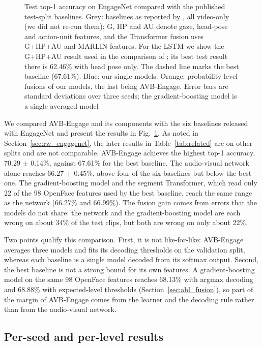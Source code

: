\documentclass[pdflatex,iicol,sn-basic]{sn-jnl}
\newcommand{\ournet}{AVB-Engage}
\begin{document}
\begin{figure}[t]
\centering

\caption{Test top-1 accuracy on EngageNet compared with the published test-split baselines. Grey: baselines as reported by \citet{singh2023engagenet}, all video-only (we did not re-run them); G, HP and AU denote gaze, head-pose and action-unit features, and the Transformer fusion uses G+HP+AU and MARLIN features. For the LSTM we show the G+HP+AU result used in the comparison of \citet{singh2023engagenet}; its best test result there is 62.46\% with head pose only. The dashed line marks the best baseline (67.61\%). Blue: our single models. Orange: probability-level fusions of our models, the last being \ournet. Error bars are standard deviations over three seeds; the gradient-boosting model is a single averaged model}
\label{fig:results}
\end{figure}

We compared \ournet{} and its components with the six baselines released with EngageNet and present the results in Fig.~\ref{fig:results}. As noted in Section~\ref{sec:rw_engagenet}, the later results in Table~\ref{tab:related} are on other splits and are not comparable. \ournet{} achieves the highest top-1 accuracy, 70.29 $\pm$ 0.14\%, against 67.61\% for the best baseline. The audio-visual network alone reaches 66.27 $\pm$ 0.45\%, above four of the six baselines but below the best one. The gradient-boosting model and the segment Transformer, which read only 22 of the 98 OpenFace features used by the best baseline, reach the same range as the network (66.27\% and 66.99\%). The fusion gain comes from errors that the models do not share: the network and the gradient-boosting model are each wrong on about 34\% of the test clips, but both are wrong on only about 22\%.

Two points qualify this comparison. First, it is not like-for-like: \ournet{} averages three models and fits its decoding thresholds on the validation split, whereas each baseline is a single model decoded from its softmax output. Second, the best baseline is not a strong bound for its own features. A gradient-boosting model on the same 98 OpenFace features reaches 68.13\% with argmax decoding and 68.88\% with expected-level thresholds (Section~\ref{sec:abl_fusion}), so part of the margin of \ournet{} comes from the learner and the decoding rule rather than from the audio-visual network.

\subsection{Per-seed and per-level results}\label{sec:res_seed}
\end{document}

